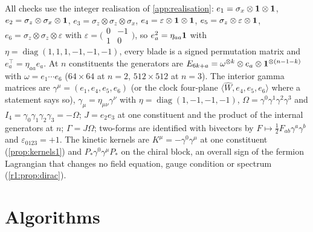 All checks use the integer realisation of \cref{app:realisation}: $e_1=\sigma_x\otimes\mathbf 1\otimes\mathbf 1$, $e_2=\sigma_z\otimes\sigma_x\otimes\mathbf 1$,
$e_3=\sigma_z\otimes\sigma_z\otimes\sigma_x$, $e_4=\varepsilon\otimes\mathbf 1\otimes\mathbf 1$, $e_5=\sigma_z\otimes\varepsilon\otimes\mathbf 1$, $e_6=\sigma_z\otimes\sigma_z\otimes\varepsilon$
with $\varepsilon=\bigl(\begin{smallmatrix}0&-1\\1&0\end{smallmatrix}\bigr)$, so $e_a^2=\eta_{aa}\mathbf 1$ with $\eta=\operatorname{diag}(1,1,1,-1,-1,-1)$, every
blade is a signed permutation matrix and $e_a^{\!\top}=\eta_{aa}e_a$. At $n$ constituents the generators are
$E_{6k+a}=\omega^{\otimes k}\otimes e_a\otimes\mathbf 1^{\otimes(n-1-k)}$ with $\omega=e_1\cdots e_6$ ($64\times64$ at $n=2$, $512\times512$ at $n=3$). The
interior gamma matrices are $\gamma^\mu=(e_1,e_4,e_5,e_6)$ (or the clock four-plane $\langle\widehat W,e_4,e_5,e_6\rangle$ where a statement
says so), $\gamma_\mu=\eta_{\mu\nu}\gamma^\nu$ with $\eta=\operatorname{diag}(1,-1,-1,-1)$, $\Omega=\gamma^0\gamma^1\gamma^2\gamma^3$ and
$I_4=\gamma_0\gamma_1\gamma_2\gamma_3=-\Omega$; $J=e_2e_3$ at one constituent and the product of the internal generators at $n$; $\Gamma=J\Omega$;
two-forms are identified with bivectors by $F\mapsto\frac12F_{ab}\gamma^a\gamma^b$ and $\varepsilon_{0123}=+1$. The kinetic kernels are
$K^\mu=-\gamma^0\gamma^\mu$ at one constituent (\cref{prop:kernels1}) and $P_*\gamma^0\gamma^\mu P_*$ on the chiral block, an overall sign
of the fermion Lagrangian that changes no field equation, gauge condition or spectrum (\cref{r1:prop:dirac}).

\section{Algorithms}
\label{app:repro:alg}

